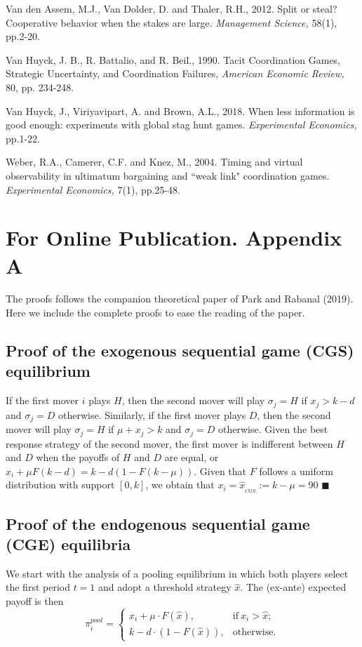 \documentclass[12pt, letterpaper]{article}
\theoremstyle{plain}
\begin{document}
\begin{thebibliography}{10}
\bibitem{} Van den Assem, M.J., Van Dolder, D. and Thaler, R.H., 2012. Split or steal? Cooperative behavior when the stakes are large. \textit{Management Science,} 58(1), pp.2-20.

\bibitem{}  Van Huyck, J. B., R. Battalio, and R. Beil., 1990. Tacit Coordination Games, Strategic Uncertainty, and Coordination Failures, \textit{American Economic Review,} 80, pp. 234-248.

\bibitem{} Van Huyck, J., Viriyavipart, A. and Brown, A.L., 2018. When less information is good enough: experiments with global stag hunt games. \textit{Experimental Economics,} pp.1-22.

\bibitem{} Weber, R.A., Camerer, C.F. and Knez, M., 2004. Timing and virtual observability in ultimatum bargaining and ``weak link" coordination games. \textit{Experimental Economics,} 7(1), pp.25-48.


\end{thebibliography}

\newpage
\section*{For Online Publication. Appendix A}
The proofs follows the companion theoretical paper of Park and Rabanal (2019). Here we include the complete proofs to ease the reading of the paper. 

\subsection*{Proof of the exogenous sequential game (CGS) equilibrium}

If the first mover $i$ plays $H$, then the second mover will play $\sigma_j= H$ if $x_j> k-d$ and $\sigma_j= D$ otherwise. Similarly, if the first mover plays $D$, then the second mover will play $\sigma_j= H$ if $\mu+x_j> k$ and  $\sigma_j= D$ otherwise. Given the best response strategy of the second mover, the first mover is indifferent between $H$ and $D$ when the payoffs of $H$ and $D$ are equal, or $x_i + \mu F(k-d) = k - d(1-F(k-\mu))$. Given that $F$ follows a uniform distribution with support $[0,k]$, we obtain that $x_i=\hat{x}_{_{CGS}}:= k-\mu=90$ $\blacksquare$

\subsection*{Proof of the endogenous sequential game (CGE) equilibria}

We start with the analysis of a pooling equilibrium in which both players select the first period $t=1$ and adopt a threshold strategy $\hat{x}$. The (ex-ante) expected payoff is then
\begin{equation}
   \pi^{pool}_{i} = 
   \begin{cases}
    x_i + \mu \cdot F(\hat{x}), &  \text{if} \  x_{i}> \hat{x};\\
    k - d \cdot (1-F(\hat{x})), & \text{otherwise}. 
   \end{cases}
   \label{pi_pool}
\end{equation}
\end{document}
